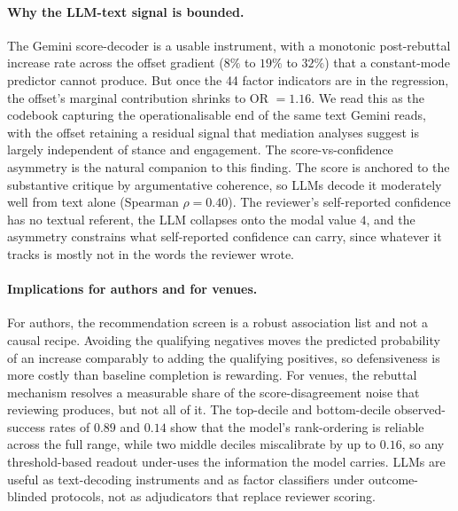 \documentclass{article}
\begin{document}
\paragraph{Why the LLM-text signal is bounded.} The Gemini score-decoder is a usable instrument, with a monotonic post-rebuttal increase rate across the offset gradient ($8\%$ to $19\%$ to $32\%$) that a constant-mode predictor cannot produce. But once the 44 factor indicators are in the regression, the offset's marginal contribution shrinks to OR $= 1.16$. We read this as the codebook capturing the operationalisable end of the same text Gemini reads, with the offset retaining a residual signal that mediation analyses suggest is largely independent of stance and engagement. The score-vs-confidence asymmetry is the natural companion to this finding. The score is anchored to the substantive critique by argumentative coherence, so LLMs decode it moderately well from text alone (Spearman $\rho = 0.40$). The reviewer's self-reported confidence has no textual referent, the LLM collapses onto the modal value $4$, and the asymmetry constrains what self-reported confidence can carry, since whatever it tracks is mostly not in the words the reviewer wrote.

\paragraph{Implications for authors and for venues.} For authors, the recommendation screen is a robust association list and not a causal recipe. Avoiding the qualifying negatives moves the predicted probability of an increase comparably to adding the qualifying positives, so defensiveness is more costly than baseline completion is rewarding. For venues, the rebuttal mechanism resolves a measurable share of the score-disagreement noise that reviewing produces, but not all of it. The top-decile and bottom-decile observed-success rates of $0.89$ and $0.14$ show that the model's rank-ordering is reliable across the full range, while two middle deciles miscalibrate by up to $0.16$, so any threshold-based readout under-uses the information the model carries. LLMs are useful as text-decoding instruments and as factor classifiers under outcome-blinded protocols, not as adjudicators that replace reviewer scoring.
\end{document}
